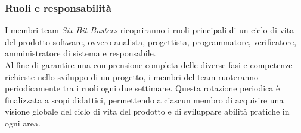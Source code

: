         \subsubsection{Ruoli e responsabilità}
            I membri team \textit{Six Bit Busters} ricopriranno i ruoli principali 
            di un ciclo di vita del prodotto software, ovvero analista, 
            progettista, programmatore, verificatore, amministratore di sistema e responsabile. \\
            Al fine di garantire una comprensione completa delle diverse fasi 
            e competenze richieste nello sviluppo di un progetto, i membri del team 
            ruoteranno periodicamente tra i ruoli ogni due settimane. Questa rotazione 
            periodica è finalizzata a scopi didattici, permettendo a ciascun membro di 
            acquisire una visione globale del ciclo di vita del prodotto e di sviluppare 
            abilità pratiche in ogni area.
